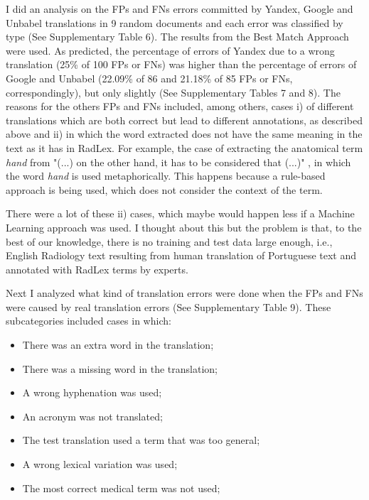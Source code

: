 I did an analysis on the FPs and FNs errors committed by Yandex, Google and Unbabel translations in 9 random documents and each error was classified by type (See Supplementary Table 6). The results from the Best Match Approach were used. As predicted, the percentage of errors of Yandex due to a wrong translation (25\% of 100 FPs or FNs) was higher than the percentage of errors of Google and Unbabel (22.09\% of 86 and 21.18\% of 85 FPs or FNs, correspondingly), but only slightly (See Supplementary Tables 7 and 8). The reasons for the others FPs and FNs included, among others, cases i) of different translations which are both correct but lead to different annotations, as described above and ii) in which the word extracted does not have the same meaning in the text as it has in RadLex. For example, the case of extracting the anatomical term \textit{hand} from "(...) on the other hand, it has to be considered that (...)" , in which the word \textit{hand} is used metaphorically. This happens because a rule-based approach is being used, which does not consider the context of the term. 

There were a lot of these ii) cases, which maybe would happen less if a Machine Learning approach was used. I thought about this but the problem is that, to the best of our knowledge, there is no training and test data large enough, i.e., English Radiology text resulting from human translation of Portuguese text and annotated with RadLex terms by experts. 

Next I analyzed what kind of translation errors were done when the FPs and FNs were caused by real translation errors (See Supplementary Table 9). These subcategories included cases in which:

\begin{itemize}
	\item There was an extra word in the translation;
	\item There was a missing word in the translation;
	\item A wrong hyphenation was used;
	\item An acronym was not translated; 
	\item The test translation used a term that was too general;
	\item A wrong lexical variation was used;
	\item The most correct medical term was not used;
\end{itemize}

